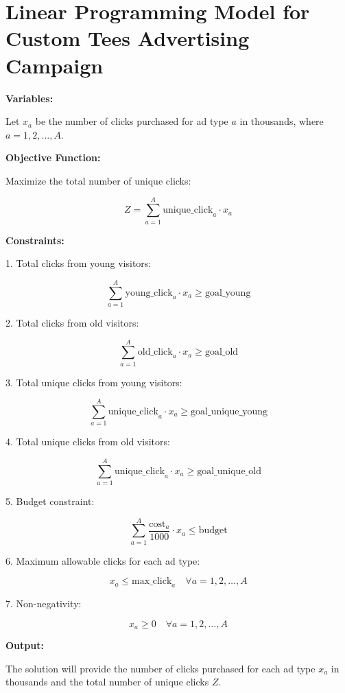 \documentclass{article}
\begin{document}
\section*{Linear Programming Model for Custom Tees Advertising Campaign}

\textbf{Variables:}

Let \( x_a \) be the number of clicks purchased for ad type \( a \) in thousands, where \( a = 1, 2, \ldots, A \).

\textbf{Objective Function:}

Maximize the total number of unique clicks:

\[
Z = \sum_{a=1}^{A} \text{unique\_click}_{a} \cdot x_a
\]

\textbf{Constraints:}

1. Total clicks from young visitors:

\[
\sum_{a=1}^{A} \text{young\_click}_{a} \cdot x_a \geq \text{goal\_young}
\]

2. Total clicks from old visitors:

\[
\sum_{a=1}^{A} \text{old\_click}_{a} \cdot x_a \geq \text{goal\_old}
\]

3. Total unique clicks from young visitors:

\[
\sum_{a=1}^{A} \text{unique\_click}_{a} \cdot x_a \geq \text{goal\_unique\_young}
\]

4. Total unique clicks from old visitors:

\[
\sum_{a=1}^{A} \text{unique\_click}_{a} \cdot x_a \geq \text{goal\_unique\_old}
\]

5. Budget constraint:

\[
\sum_{a=1}^{A} \frac{\text{cost}_{a}}{1000} \cdot x_a \leq \text{budget}
\]

6. Maximum allowable clicks for each ad type:

\[
x_a \leq \text{max\_click}_{a} \quad \forall a = 1, 2, \ldots, A
\]

7. Non-negativity:

\[
x_a \geq 0 \quad \forall a = 1, 2, \ldots, A
\]

\textbf{Output:}

The solution will provide the number of clicks purchased for each ad type \( x_a \) in thousands and the total number of unique clicks \( Z \).
\end{document}

